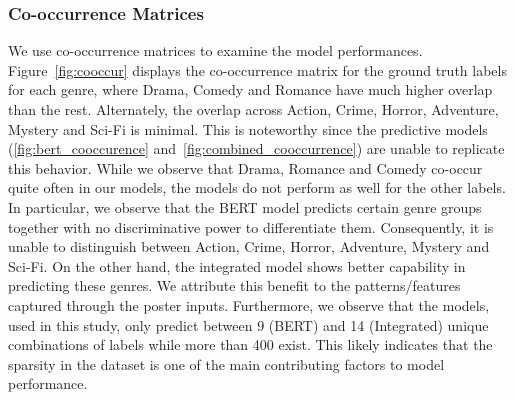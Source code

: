 \documentclass[10pt]{article}
\begin{document}
\subsubsection{Co-occurrence Matrices}
\label{sec:cooccur}
We use co-occurrence matrices to examine the model performances. Figure~\ref{fig:cooccur} displays the co-occurrence matrix for the ground truth labels for each genre, where Drama, Comedy and Romance have much higher overlap than the rest. Alternately, the overlap across Action, Crime, Horror, Adventure, Mystery and Sci-Fi is minimal. This is noteworthy since the predictive models (\ref{fig:bert_cooccurence} and~\ref{fig:combined_cooccurrence}) are unable to replicate this behavior. While we observe that Drama, Romance and Comedy co-occur quite often in our models, the models do not perform as well for the other labels. In particular, we observe that the BERT model predicts certain genre groups together with no discriminative power to differentiate them. Consequently, it is unable to distinguish between Action, Crime, Horror, Adventure, Mystery and Sci-Fi. On the other hand, the integrated model shows better capability in predicting these genres. We attribute this benefit to the patterns/features captured through the poster inputs. Furthermore, we observe that the models, used in this study, only predict between 9 (BERT) and 14 (Integrated) unique combinations of labels while more than 400 exist. This likely indicates that the sparsity in the dataset is one of the main contributing factors to model performance.
\end{document}
